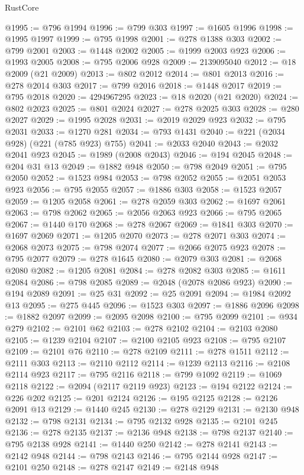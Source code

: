 \begin{lexlean}{RustCore}
\begin{coremodule}
@1995 := @796 @1994
@1996 := @799 @303
@1997 := @1605 @1996
@1998 := @1995 @1997
@1999 := @795 @1998
@2001 := @278 @1388 @303
@2002 := @799 @2001
@2003 := @1448 @2002
@2005 := @1999 @2003 @923
@2006 := @1993 @2005
@2008 := @795 @2006 @928
@2009 := 2139095040
@2012 := @18 @2009 (@21 @2009)
@2013 := @802 @2012
@2014 := @801 @2013
@2016 := @278 @2014 @303
@2017 := @799 @2016
@2018 := @1448 @2017
@2019 := @795 @2018
@2020 := 4294967295
@2023 := @18 @2020 (@21 @2020)
@2024 := @802 @2023
@2025 := @801 @2024
@2027 := @278 @2025 @303
@2028 := @280 @2027
@2029 := @1995 @2028
@2031 := @2019 @2029 @923
@2032 := @795 @2031
@2033 := @1270 @281
@2034 := @793 @1431
@2040 := @221 (@2034 @928) (@221 (@785 @923) @755)
@2041 := @2033 @2040
@2043 := @2032 @2041 @923
@2045 := @1989 (@2008 @2043)
@2046 := @194 @2045
@2048 := @204 @31 @13
@2049 := @1882 @948
@2050 := @798 @2049
@2051 := @795 @2050
@2052 := @1523 @984
@2053 := @798 @2052
@2055 := @2051 @2053 @923
@2056 := @795 @2055
@2057 := @1886 @303
@2058 := @1523 @2057
@2059 := @1205 @2058
@2061 := @278 @2059 @303
@2062 := @1697 @2061
@2063 := @798 @2062
@2065 := @2056 @2063 @923
@2066 := @795 @2065
@2067 := @1440 @170
@2068 := @278 @2067
@2069 := @1841 @303
@2070 := @1697 @2069
@2071 := @1205 @2070
@2073 := @278 @2071 @303
@2074 := @2068 @2073
@2075 := @798 @2074
@2077 := @2066 @2075 @923
@2078 := @795 @2077
@2079 := @278 @1645
@2080 := @2079 @303
@2081 := @2068 @2080
@2082 := @1205 @2081
@2084 := @278 @2082 @303
@2085 := @1611 @2084
@2086 := @798 @2085
@2089 := @2048 (@2078 @2086 @923)
@2090 := @194 @2089
@2091 := @25 @31
@2092 := @25 @2091
@2094 := @1984 @2092 @13
@2095 := @275 @445
@2096 := @1523 @303
@2097 := @1886 @2096
@2098 := @1882 @2097
@2099 := @2095 @2098
@2100 := @795 @2099
@2101 := @934 @279
@2102 := @2101 @62
@2103 := @278 @2102
@2104 := @2103 @2080
@2105 := @1239 @2104
@2107 := @2100 @2105 @923
@2108 := @795 @2107
@2109 := @2101 @76
@2110 := @278 @2109
@2111 := @278 @1511
@2112 := @2111 @303
@2113 := @2110 @2112
@2114 := @1239 @2113
@2116 := @2108 @2114 @923
@2117 := @795 @2116
@2118 := @799 @1092
@2119 := @1069 @2118
@2122 := @2094 (@2117 @2119 @923)
@2123 := @194 @2122
@2124 := @226 @202
@2125 := @201 @2124
@2126 := @195 @2125
@2128 := @2126 @2091 @13
@2129 := @1440 @245
@2130 := @278 @2129
@2131 := @2130 @948
@2132 := @798 @2131
@2134 := @795 @2132 @928
@2135 := @2101 @245
@2136 := @278 @2135
@2137 := @2136 @948
@2138 := @798 @2137
@2140 := @795 @2138 @928
@2141 := @1440 @250
@2142 := @278 @2141
@2143 := @2142 @948
@2144 := @798 @2143
@2146 := @795 @2144 @928
@2147 := @2101 @250
@2148 := @278 @2147
@2149 := @2148 @948

\end{coremodule}
\end{lexlean}
